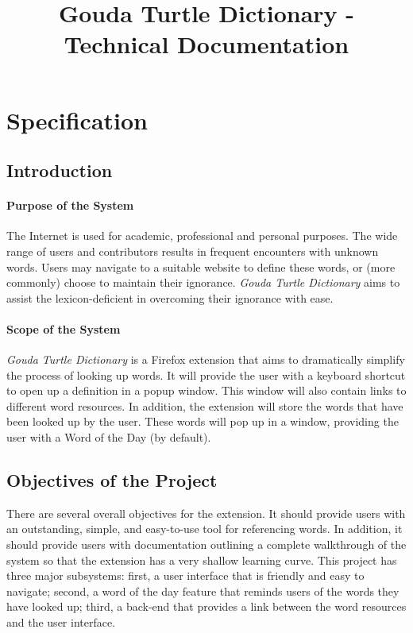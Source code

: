 \documentclass{article}
\title{Gouda Turtle Dictionary - Technical Documentation}
\begin{document}
\section{Specification}

\subsection{Introduction}

\paragraph{Purpose of the System}
The Internet is used for academic, professional and personal purposes.
The wide range of users and contributors results in frequent encounters
with unknown words. Users may navigate to a suitable website to define
these words, or (more commonly) choose to maintain their ignorance.
\emph{Gouda Turtle Dictionary} aims to assist the lexicon-deficient in
overcoming their ignorance with ease.

\paragraph{Scope of the System}
\emph{Gouda Turtle Dictionary} is a Firefox extension that aims to dramatically
simplify the process of looking up words. It will provide the user with a keyboard
shortcut to open up a definition in a popup window. This window will also
contain links to different word resources. In addition, the extension will
store the words that have been looked up by the user. These words will pop
up in a window, providing the user with a Word of the Day (by default).

\subsection{Objectives of the Project}

There are several overall objectives for the extension. It should provide
users with an outstanding, simple, and easy-to-use tool for
referencing words. In addition, it should provide users with documentation
outlining a complete walkthrough of the system so that the extension has a
very shallow learning curve. This project has three major subsystems: first,
a user interface that is friendly and easy to navigate; second, a word of the
day feature that reminds users of the words they have looked up; third, a
back-end that provides a link between the word resources and the user interface.
\end{document}

